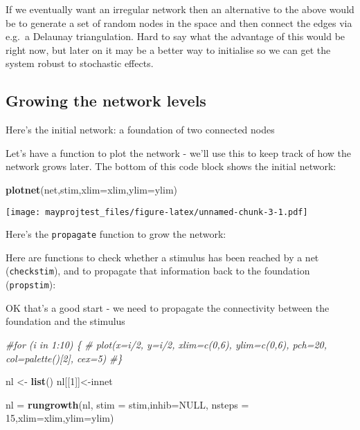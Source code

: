 \documentclass[]{article}
\newenvironment{Shaded}{\begin{snugshade}}{\end{snugshade}}
\newcommand{\CommentTok}[1]{\textcolor[rgb]{0.56,0.35,0.01}{\textit{#1}}}
\newcommand{\DataTypeTok}[1]{\textcolor[rgb]{0.13,0.29,0.53}{#1}}
\newcommand{\DecValTok}[1]{\textcolor[rgb]{0.00,0.00,0.81}{#1}}
\newcommand{\KeywordTok}[1]{\textcolor[rgb]{0.13,0.29,0.53}{\textbf{#1}}}
\newcommand{\NormalTok}[1]{#1}
\newcommand{\OtherTok}[1]{\textcolor[rgb]{0.56,0.35,0.01}{#1}}
\newcommand{\StringTok}[1]{\textcolor[rgb]{0.31,0.60,0.02}{#1}}
\begin{document}
If we eventually want an irregular network then an alternative to the
above would be to generate a set of random nodes in the space and then
connect the edges via e.g.~a Delaunay triangulation. Hard to say what
the advantage of this would be right now, but later on it may be a
better way to initialise so we can get the system robust to stochastic
effects.

\hypertarget{growing-the-network-levels}{%
\subsection{Growing the network
levels}\label{growing-the-network-levels}}

Here's the initial network: a foundation of two connected nodes

Let's have a function to plot the network - we'll use this to keep track
of how the network grows later. The bottom of this code block shows the
initial network:

\begin{Shaded}
\begin{Highlighting}[]
\KeywordTok{plotnet}\NormalTok{(net,stim,}\DataTypeTok{xlim=}\NormalTok{xlim,}\DataTypeTok{ylim=}\NormalTok{ylim)}
\end{Highlighting}
\end{Shaded}

\texttt{[image: mayprojtest\_files/figure-latex/unnamed-chunk-3-1.pdf]}

Here's the \texttt{propagate} function to grow the network:

Here are functions to check whether a stimulus has been reached by a net
(\texttt{checkstim}), and to propagate that information back to the
foundation (\texttt{propstim}):

OK that's a good start - we need to propagate the connectivity between
the foundation and the stimulus

\begin{Shaded}
\begin{Highlighting}[]
\CommentTok{#for (i in 1:10) \{}
\CommentTok{#    plot(x=i/2, y=i/2, xlim=c(0,6), ylim=c(0,6), pch=20, col=palette()[2], cex=5)}
\CommentTok{#\}}




\NormalTok{nl <-}\StringTok{ }\KeywordTok{list}\NormalTok{()}
\NormalTok{nl[[}\DecValTok{1}\NormalTok{]]<-innet}

\NormalTok{nl =}\StringTok{ }\KeywordTok{rungrowth}\NormalTok{(nl, }\DataTypeTok{stim =}\NormalTok{ stim,}\DataTypeTok{inhib=}\OtherTok{NULL}\NormalTok{, }\DataTypeTok{nsteps =} \DecValTok{15}\NormalTok{,}\DataTypeTok{xlim=}\NormalTok{xlim,}\DataTypeTok{ylim=}\NormalTok{ylim)}
\end{Highlighting}
\end{Shaded}
\end{document}
